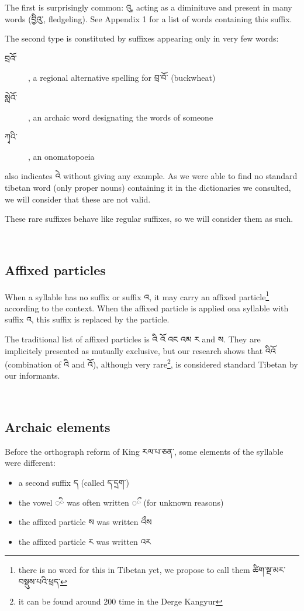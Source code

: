 \documentclass[%
a4paper,%
pagesize,%
12pt,%
parskip=off,%
bibliography=totoc,%
numbers=noenddot,%
DIV=12,%
twoside=semi,%
headings=normal%
]{scrartcl}
\begin{document}
The first is surprisingly common: འུ, acting as a diminituve and present in many words (བྱིའུ་, fledgeling). See Appendix 1 for a list of words containing this suffix.

The second type is constituted by suffixes appearing only in very few words:

\begin{description}
\item[བྲའོ་], a regional alternative spelling for བྲ་བོ་ (buckwheat)
\item[སླེའོ་], an archaic word designating the words of someone
\item[ཀྭའི་], an onomatopoeia
\end{description}

\cite{TournadreMST} also indicates འེ without giving any example. As we were able to find no standard tibetan word (only proper nouns) containing it in the dictionaries we consulted, we will consider that these are not valid.

These rare suffixes behave like regular suffixes, so we will consider them as such.

­\subsection{Affixed particles}

When a syllable has no suffix or suffix འ, it may carry an affixed particle\footnote{there is no word for this in Tibetan yet, we propose to call them ཚིག་སྔ་མར་བསྡུས་པའི་ཕྲད་} according to the context. When the affixed particle is applied ona syllable with suffix འ, this suffix is replaced by the particle.

The traditional list of affixed particles is འི འོ འང འམ ར and ས. They are implicitely presented as mutually exclusive, but our research shows that འིའོ (combination of འི and འོ), although very rare\footnote{it can be found around 200 time in the Derge Kangyur}, is considered standard Tibetan by our informants.

­\subsection{Archaic elements}

Before the orthograph reform of King རལ་པ་ཅན་, some elements of the syllable were different:

\begin{itemize}
\item a second suffix ད (called ད་དྲག་)
\item the vowel {\tibetanfont ◌}ི was often written {\tibetanfont ◌}ྀ (for unknown reasons)
\item the affixed particle ས was written འྀས
\item the affixed particle ར was written འར
\end{itemize}
\end{document}
